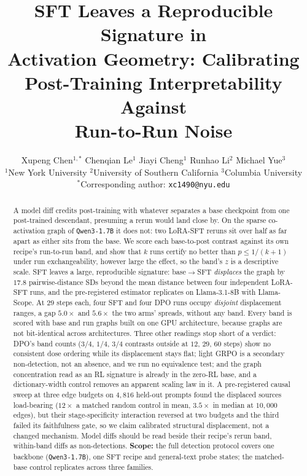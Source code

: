 \documentclass{article}
\title{SFT Leaves a Reproducible Signature in\\Activation Geometry: Calibrating\\Post-Training Interpretability Against\\Run-to-Run Noise}
\author{Xupeng Chen$^{1,*}$ \quad Chenqian Le$^{1}$ \quad Jiayi Cheng$^{1}$ \quad Runhao Li$^{2}$ \quad Michael Yue$^{3}$ \\
{\normalfont $^{1}$New York University \quad $^{2}$University of Southern California \quad $^{3}$Columbia University} \\
{\normalfont $^{*}$Corresponding author: \texttt{xc1490@nyu.edu}}}
\date{}
\begin{document}
\maketitle
{}

\begin{abstract}
A model diff credits post-training with whatever separates a base checkpoint
from one post-trained descendant, presuming a rerun would land close by.
On the sparse co-activation graph of \texttt{Qwen3-1.7B} it does not: two
LoRA-SFT reruns sit over half as far apart as either sits from the base. We score each base-to-post contrast against its
own recipe's run-to-run band, and show that $k$
runs certify no better than $p\le1/(k+1)$ under run exchangeability, however large the effect, so
the band's $z$ is a descriptive scale. SFT leaves a large, reproducible
signature: base$\to$SFT \emph{displaces} the graph by $17.8$ pairwise-distance
SDs beyond the mean distance between four independent LoRA-SFT runs, and the pre-registered
estimator replicates on Llama-3.1-8B with Llama-Scope. At $29$
steps each, four SFT and four DPO runs occupy \emph{disjoint}
displacement ranges, a gap $5.0\times$ and $5.6\times$ the two arms' spreads, without
any band. Every band is scored with base and run graphs built on one GPU
architecture, because graphs are not bit-identical across architectures.
Three other readings stop short of a verdict: DPO's band counts ($3/4$, $1/4$,
$3/4$ contrasts outside at $12$, $29$, $60$ steps) show no consistent dose
ordering while its displacement stays flat; light GRPO is a secondary
non-detection, not an absence, and we run no equivalence test; and the graph
concentration read as an RL signature is already in the zero-RL base, and a
dictionary-width control removes an apparent scaling law in it. A pre-registered causal sweep at three edge budgets on $4{,}816$ held-out prompts found
the displaced sources load-bearing ($12\times$ a matched random control in mean, $3.5\times$ in median at $10{,}000$ edges), but
their stage-specificity interaction reversed at two budgets and the third failed its faithfulness gate,
so we claim calibrated structural displacement, not a changed mechanism.
Model diffs should be read beside their recipe's rerun band, within-band diffs
as non-detections.
\textbf{Scope:} the full detection protocol covers one backbone
(\texttt{Qwen3-1.7B}), one SFT recipe and general-text probe states; the
matched-base control replicates across three families.
\end{abstract}
\end{document}

